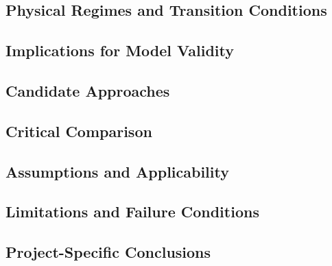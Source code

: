 
\subsection{Physical Regimes and Transition Conditions}
\label{sec:res-phy-lod-physical-regimes-transition-conditions}


\subsection{Implications for Model Validity}
\label{sec:res-phy-lod-model-validity-implications}


\subsection{Candidate Approaches}
\label{sec:res-phy-lod-candidate-approaches}


\subsection{Critical Comparison}
\label{sec:res-phy-lod-critical-comparison}


\subsection{Assumptions and Applicability}
\label{sec:res-phy-lod-assumptions}


\subsection{Limitations and Failure Conditions}
\label{sec:res-phy-lod-limitations}


\subsection{Project-Specific Conclusions}
\label{sec:res-phy-lod-conclusions}

